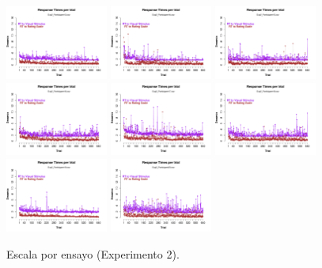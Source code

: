 \begin{figure}[th]
\includegraphics[width=0.30\textwidth]{Figures/RTs_Exp2_P13} \includegraphics[width=0.30\textwidth]{Figures/RTs_Exp2_P14} \includegraphics[width=0.30\textwidth]{Figures/RTs_Exp2_P15}
\includegraphics[width=0.30\textwidth]{Figures/RTs_Exp2_P16} \includegraphics[width=0.30\textwidth]{Figures/RTs_Exp2_P17} \includegraphics[width=0.30\textwidth]{Figures/RTs_Exp2_P18}
\includegraphics[width=0.30\textwidth]{Figures/RTs_Exp2_P19} \includegraphics[width=0.30\textwidth]{Figures/RTs_Exp2_P20} 
\caption[Rating_Exp2]{Escala por ensayo (Experimento 2).}
\label{fig:Rating_E2}
\end{figure}


